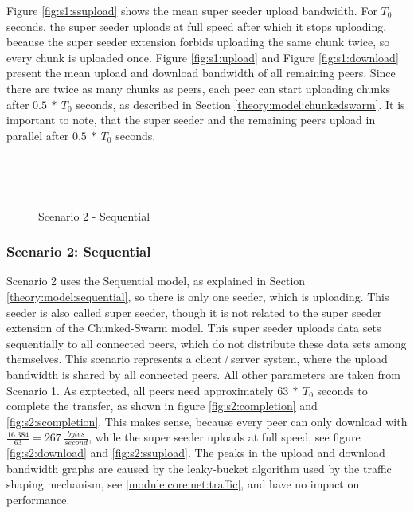Figure \ref{fig:s1:ssupload} shows the mean super seeder upload bandwidth. For $T_0$ seconds, the super seeder uploads at full speed after which it stops uploading, because the super seeder extension forbids uploading the same chunk twice, so every chunk is uploaded once. Figure \ref{fig:s1:upload} and Figure \ref{fig:s1:download} present the mean upload and download bandwidth of all remaining peers. Since there are twice as many chunks as peers, each peer can start uploading chunks after $0.5\:*\:T_0$ seconds, as described in Section \ref{theory:model:chunkedswarm}. It is important to note, that the super seeder and the remaining peers upload in parallel after $0.5\:*\:T_0$ seconds.



\begin{figure}[ht]
	\begin{center}
		~ %

		~ %

		\caption{Scenario 2 - Sequential}
		\label{fig:s2}
	\end{center}
\end{figure}

\pagebreak
\subsubsection{Scenario 2: Sequential}

Scenario 2 uses the Sequential model, as explained in Section \ref{theory:model:sequential}, so there is only one seeder, which is uploading. This seeder is also called super seeder, though it is not related to the super seeder extension of the Chunked-Swarm model. This super seeder uploads data sets sequentially to all connected peers, which do not distribute these data sets among themselves. This scenario represents a client\,/\,server system, where the upload bandwidth is shared by all connected peers. All other parameters are taken from Scenario 1. As exptected, all peers need approximately $63\:*\:T_0$ seconds to complete the transfer, as shown in figure \ref{fig:s2:completion} and \ref{fig:s2:scompletion}. This makes sense, because every peer can only download with $\frac{16.384}{63}=267\:\frac{bytes}{second}$, while the super seeder uploads at full speed, see figure \ref{fig:s2:download} and \ref{fig:s2:ssupload}. The peaks in the upload and download bandwidth graphs are caused by the leaky-bucket algorithm used by the traffic shaping mechanism, see \ref{module:core:net:traffic}, and have no impact on performance.




